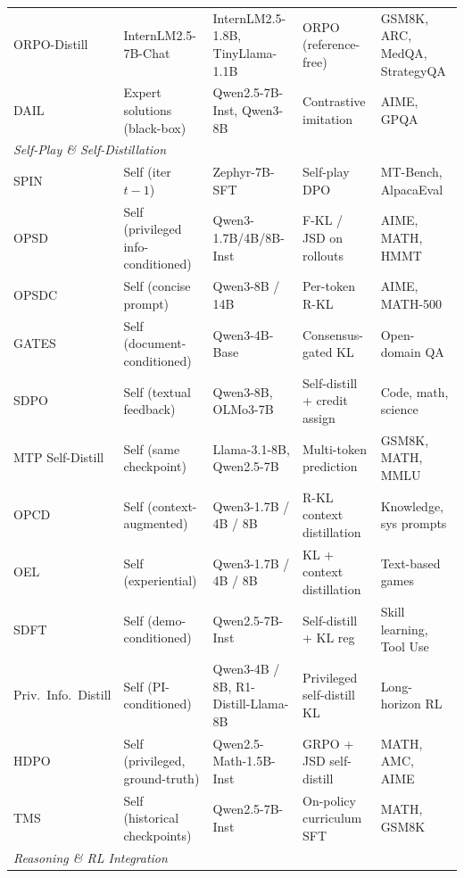 \documentclass{article} %
\begin{document}
\begin{table}[t]
{\begin{tabular}{@{}lllll@{}}
        ORPO-Distill \citep{2509.25100} & InternLM2.5-7B-Chat & InternLM2.5-1.8B, TinyLlama-1.1B & ORPO (reference-free) & GSM8K, ARC, MedQA, StrategyQA \\
        DAIL \citep{2602.02405} & Expert solutions (black-box) & Qwen2.5-7B-Inst, Qwen3-8B & Contrastive imitation & AIME, GPQA \\
        \midrule
        \multicolumn{5}{l}{\textit{Self-Play \& Self-Distillation}} \\
        \midrule
        SPIN \citep{2401.01335} & Self (iter $t{-}1$) & Zephyr-7B-SFT & Self-play DPO & MT-Bench, AlpacaEval \\
        OPSD \citep{2601.18734} & Self (privileged info-conditioned) & Qwen3-1.7B/4B/8B-Inst & F-KL / JSD on rollouts & AIME, MATH, HMMT \\
        OPSDC \citep{2603.05433} & Self (concise prompt) & Qwen3-8B / 14B & Per-token R-KL & AIME, MATH-500 \\
        GATES \citep{2602.20574} & Self (document-conditioned) & Qwen3-4B-Base & Consensus-gated KL & Open-domain QA \\
        SDPO \citep{2601.20802} & Self (textual feedback) & Qwen3-8B, OLMo3-7B & Self-distill + credit assign & Code, math, science \\
        MTP Self-Distill \citep{2602.06019} & Self (same checkpoint) & Llama-3.1-8B, Qwen2.5-7B & Multi-token prediction & GSM8K, MATH, MMLU \\
        OPCD \citep{2602.12275} & Self (context-augmented) & Qwen3-1.7B / 4B / 8B & R-KL context distillation & Knowledge, sys prompts \\
        OEL \citep{2603.16856} & Self (experiential) & Qwen3-1.7B / 4B / 8B & KL + context distillation & Text-based games \\
        SDFT \citep{2601.19897} & Self (demo-conditioned) & Qwen2.5-7B-Inst & Self-distill + KL reg & Skill learning, Tool Use \\
        Priv.\ Info.\ Distill \citep{2602.04942} & Self (PI-conditioned) & Qwen3-4B / 8B, R1-Distill-Llama-8B & Privileged self-distill KL & Long-horizon RL \\
        HDPO \citep{2603.23871} & Self (privileged, ground-truth) & Qwen2.5-Math-1.5B-Inst & GRPO + JSD self-distill & MATH, AMC, AIME \\
        TMS \citep{2602.03073} & Self (historical checkpoints) & Qwen2.5-7B-Inst & On-policy curriculum SFT & MATH, GSM8K \\
        \midrule
        \multicolumn{5}{l}{\textit{Reasoning \& RL Integration}} \\

\end{tabular}}
\end{table}
\end{document}
